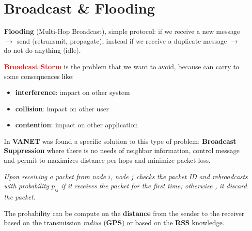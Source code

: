 \section{Broadcast \& Flooding}
\textbf{Flooding} (Multi-Hop Broadcast), simple protocol: if we receive a new message $\rightarrow$ send (retransmit, propagate), instead if we receive a duplicate message $\rightarrow$ do not do anything (idle).
\begin{boxA}
    \textcolor{red}{\textbf{Broadcast Storm}} is the problem that we want to avoid, because can carry to some consequences like:
    \begin{itemize}[nosep]
        \item \textbf{interference}: impact on other system
        \item \textbf{collision}: impact on other user
        \item \textbf{contention}: impact on other application
    \end{itemize}
\end{boxA}
In \textbf{VANET} was found a specific solution to this type of problem: \textbf{Broadcast Suppression} where there is no needs of neighbor information, control message and permit to maximizes distance per hops and minimize packet loss.
\begin{boxA}
    \textit{
        Upon receiving a packet from node $i$, node $j$ checks the packet ID and rebroadcasts with probability $p_{ij}$ if it receives the packet for the first time; otherwise , it discard the packet.
    }
\end{boxA}
The probability can be compute on the \textbf{distance} from the sender to the receiver based on the transmission \textit{radius} (\textbf{GPS}) or based on the \textbf{RSS} knowledge. 


